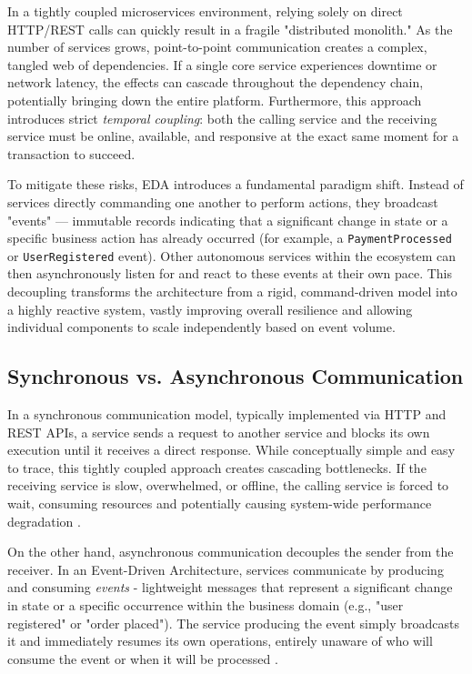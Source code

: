 In a tightly coupled microservices environment, relying solely on direct HTTP/REST calls can quickly result in a fragile "distributed monolith." As the number of services grows, point-to-point communication creates a complex, tangled web of dependencies. If a single core service experiences downtime or network latency, the effects can cascade throughout the dependency chain, potentially bringing down the entire platform. Furthermore, this approach introduces strict \textit{temporal coupling}: both the calling service and the receiving service must be online, available, and responsive at the exact same moment for a transaction to succeed.

To mitigate these risks, \gls{EDA} introduces a fundamental paradigm shift. Instead of services directly commanding one another to perform actions, they broadcast "events" — immutable records indicating that a significant change in state or a specific business action has already occurred (for example, a \texttt{PaymentProcessed} or \texttt{UserRegistered} event). Other autonomous services within the ecosystem can then asynchronously listen for and react to these events at their own pace. This decoupling transforms the architecture from a rigid, command-driven model into a highly reactive system, vastly improving overall resilience and allowing individual components to scale independently based on event volume.

\subsection{Synchronous vs. Asynchronous Communication}

In a synchronous communication model, typically implemented via HTTP and REST APIs, a service sends a request to another service and blocks its own execution until it receives a direct response. While conceptually simple and easy to trace, this tightly coupled approach creates cascading bottlenecks. If the receiving service is slow, overwhelmed, or offline, the calling service is forced to wait, consuming resources and potentially causing system-wide performance degradation \cite{microsoft_async_messaging}.

On the other hand, asynchronous communication decouples the sender from the receiver. In an Event-Driven Architecture, services communicate by producing and consuming \textit{events} - lightweight messages that represent a significant change in state or a specific occurrence within the business domain (e.g., "user registered" or "order placed"). The service producing the event simply broadcasts it and immediately resumes its own operations, entirely unaware of who will consume the event or when it will be processed \cite{ibm_eda_2024}.

